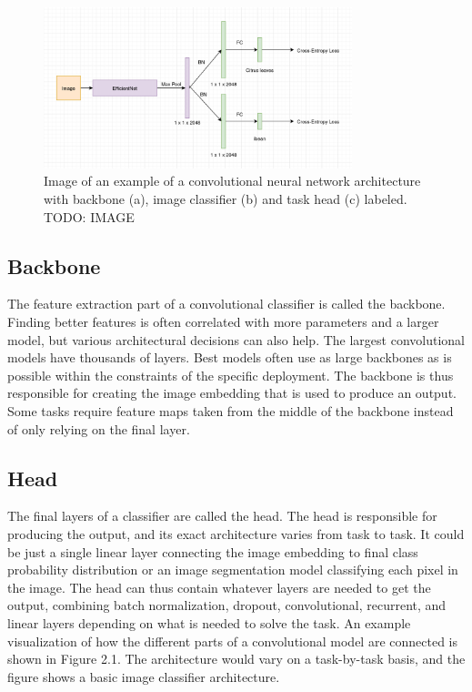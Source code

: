 \begin{figure}[h!] 
\centering 
\includegraphics[width=0.8\textwidth]{imgs/object_classification_architecture.png}
\caption{Image of an example of a convolutional neural network architecture with backbone (a), image classifier (b) and task head (c) labeled. TODO: IMAGE}
\end{figure}

\subsection{Backbone}
The feature extraction part of a convolutional classifier is called the backbone.
Finding better features is often correlated with more parameters and a larger model, but various architectural decisions can also help.
The largest convolutional models have thousands of layers.
Best models often use as large backbones as is possible within the constraints of the specific deployment.
The backbone is thus responsible for creating the image embedding that is used to produce an output.
Some tasks require feature maps taken from the middle of the backbone instead of only relying on the final layer.

\subsection{Head}
The final layers of a classifier are called the head.
The head is responsible for producing the output, and its exact architecture varies from task to task.
It could be just a single linear layer connecting the image embedding to final class probability distribution or an image segmentation model classifying each pixel in the image.
The head can thus contain whatever layers are needed to get the output, combining batch normalization, dropout, convolutional, recurrent, and linear layers depending on what is needed to solve the task.
An example visualization of how the different parts of a convolutional model are connected is shown in Figure 2.1.
The architecture would vary on a task-by-task basis, and the figure shows a basic image classifier architecture.


